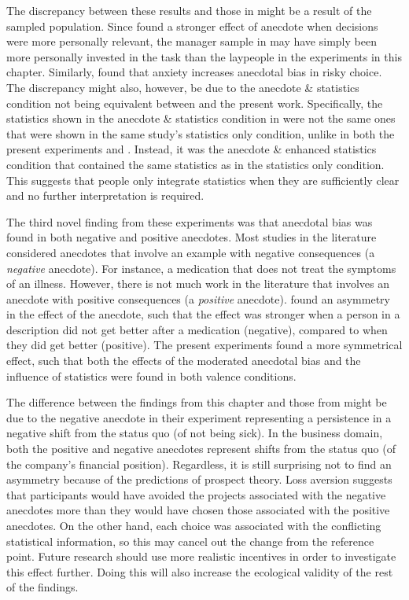 \documentclass[a4paper, nobind, dvipsnames]{templates/ociamthesis}
\theoremstyle{definition}
\theoremstyle{definition}
\theoremstyle{definition}
\theoremstyle{definition}
\theoremstyle{remark}
\begin{document}
The discrepancy between these results and those in \textcite{wainberg2013} might be a
result of the sampled population. Since \textcite{freling2020} found a stronger effect of
anecdote when decisions were more personally relevant, the manager sample in
\textcite{wainberg2013} may have simply been more personally invested in the task than the
laypeople in the experiments in this chapter. Similarly, \textcite{yang2015} found that
anxiety increases anecdotal bias in risky choice. The discrepancy might also,
however, be due to the anecdote \& statistics condition not being equivalent
between \textcite{wainberg2013} and the present work. Specifically, the statistics shown
in the anecdote \& statistics condition in \textcite{wainberg2013} were not the same ones
that were shown in the same study's statistics only condition, unlike in both
the present experiments and \textcite{wainberg2018}. Instead, it was the anecdote \&
enhanced statistics condition that contained the same statistics as in the
statistics only condition. This suggests that people only integrate statistics
when they are sufficiently clear and no further interpretation is required.

The third novel finding from these experiments was that anecdotal bias was found
in both negative and positive anecdotes. Most studies in the literature
considered anecdotes that involve an example with negative consequences (a
\emph{negative} anecdote). For instance, a medication that does not treat the
symptoms of an illness. However, there is not much work in the literature that
involves an anecdote with positive consequences (a \emph{positive} anecdote).
\textcite{jaramillo2019} found an asymmetry in the effect of the anecdote, such that the
effect was stronger when a person in a description did not get better after a
medication (negative), compared to when they did get better (positive). The
present experiments found a more symmetrical effect, such that both the effects
of the moderated anecdotal bias and the influence of statistics were found in
both valence conditions.

The difference between the findings from this chapter and those from
\textcite{jaramillo2019} might be due to the negative anecdote in their experiment
representing a persistence in a negative shift from the status quo (of not being
sick). In the business domain, both the positive and negative anecdotes
represent shifts from the status quo (of the company's financial position).
Regardless, it is still surprising not to find an asymmetry because of the
predictions of prospect theory. Loss aversion suggests that participants would
have avoided the projects associated with the negative anecdotes more than they
would have chosen those associated with the positive anecdotes. On the other
hand, each choice was associated with the conflicting statistical information,
so this may cancel out the change from the reference point. Future research
should use more realistic incentives in order to investigate this effect
further. Doing this will also increase the ecological validity of the rest of
the findings.
\end{document}
